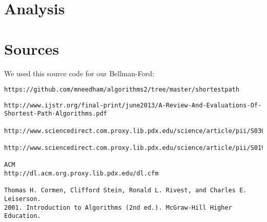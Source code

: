 \documentclass{article}
\begin{document}
\section{Analysis}

\section{Sources}

We used this source code for our Bellman-Ford:
\begin{verbatim}
https://github.com/mneedham/algorithms2/tree/master/shortestpath
\end{verbatim}


\begin{verbatim}
http://www.ijstr.org/final-print/june2013/A-Review-And-Evaluations-Of-Shortest-Path-Algorithms.pdf

http://www.sciencedirect.com.proxy.lib.pdx.edu/science/article/pii/S0304397502006138#

http://www.sciencedirect.com.proxy.lib.pdx.edu/science/article/pii/S0196677403000464

ACM
http://dl.acm.org.proxy.lib.pdx.edu/dl.cfm

Thomas H. Cormen, Clifford Stein, Ronald L. Rivest, and Charles E. Leiserson.
2001. Introduction to Algorithms (2nd ed.). McGraw-Hill Higher Education. 
\end{verbatim}
\end{document}
